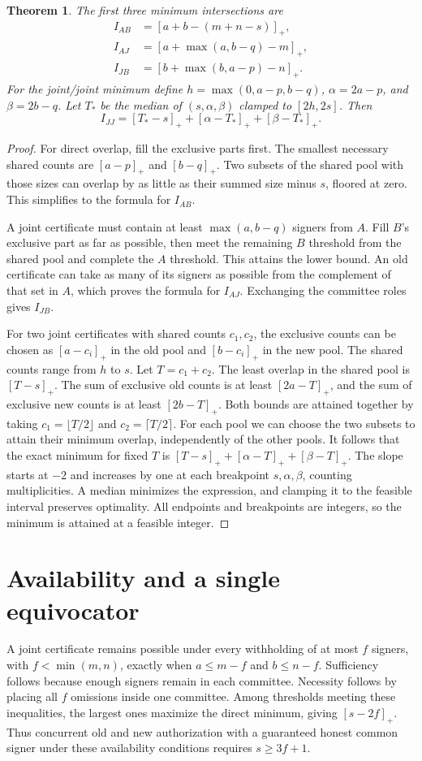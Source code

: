 \documentclass[11pt]{article}
\newtheorem{theorem}{Theorem}
\begin{document}
\begin{theorem}
The first three minimum intersections are
\begin{align*}
 I_{AB}&=[a+b-(m+n-s)]_+,\\
 I_{AJ}&=[a+\max(a,b-q)-m]_+,\\
 I_{JB}&=[b+\max(b,a-p)-n]_+.
\end{align*}
For the joint/joint minimum define $h=\max(0,a-p,b-q)$,
$\alpha=2a-p$, and $\beta=2b-q$. Let $T_*$ be the median
of $(s,\alpha,\beta)$ clamped to $[2h,2s]$. Then
\[
 I_{JJ}=[T_*-s]_++[\alpha-T_*]_++[\beta-T_*]_+ .
\]
\end{theorem}
\begin{proof}
For direct overlap, fill the exclusive parts first. The smallest
necessary shared counts are $[a-p]_+$ and $[b-q]_+$. Two subsets
of the shared pool with those sizes can overlap by as little as
their summed size minus $s$, floored at zero. This simplifies to
the formula for $I_{AB}$.

A joint certificate must contain at least $\max(a,b-q)$ signers
from $A$. Fill $B$'s exclusive part as far as possible, then meet
the remaining $B$ threshold from the shared pool and complete the
$A$ threshold. This attains the lower bound. An old certificate
can take as many of its signers as possible from the complement
of that set in $A$, which proves the formula for $I_{AJ}$.
Exchanging the committee roles gives $I_{JB}$.

For two joint certificates with shared counts $c_1,c_2$, the
exclusive counts can be chosen as $[a-c_i]_+$ in the old
pool and $[b-c_i]_+$ in the new pool. The shared counts range
from $h$ to $s$. Let $T=c_1+c_2$. The least overlap in the
shared pool is $[T-s]_+$. The sum of exclusive old counts
is at least $[2a-T]_+$, and the sum of exclusive new counts
is at least $[2b-T]_+$. Both bounds are attained together by
taking $c_1=\lfloor T/2\rfloor$ and $c_2=\lceil T/2\rceil$.
For each pool we can choose the two subsets to attain their
minimum overlap, independently of the other pools. It follows
that the exact minimum for fixed $T$ is
$[T-s]_++[\alpha-T]_++[\beta-T]_+$.
The slope starts at $-2$ and increases by one at each
breakpoint $s,\alpha,\beta$, counting multiplicities. A median
minimizes the expression, and clamping it to the feasible
interval preserves optimality. All endpoints and breakpoints
are integers, so the minimum is attained at a feasible integer.
\end{proof}

\section{Availability and a single equivocator}
A joint certificate remains possible under every withholding of
at most $f$ signers, with $f<\min(m,n)$, exactly when
$a\le m-f$ and $b\le n-f$. Sufficiency follows because enough
signers remain in each committee. Necessity follows by placing
all $f$ omissions inside one committee. Among thresholds meeting
these inequalities, the largest ones maximize the direct
minimum, giving $[s-2f]_+$. Thus concurrent old and new
authorization with a guaranteed honest common signer under
these availability conditions requires $s\ge 3f+1$.
\end{document}
